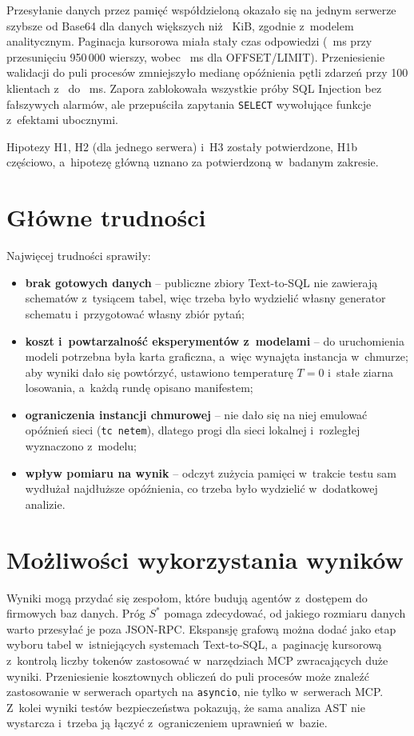 Przesyłanie danych przez pamięć współdzieloną okazało się na jednym serwerze szybsze od Base64 dla danych większych niż \wynSstarLoopShm~KiB, zgodnie z~modelem analitycznym. Paginacja kursorowa miała stały czas odpowiedzi (\wynKeysetDeep~ms przy przesunięciu 950\,000 wierszy, wobec \wynOffsetDeep~ms dla OFFSET/LIMIT). Przeniesienie walidacji do puli procesów zmniejszyło medianę opóźnienia pętli zdarzeń przy 100 klientach z~\wynCcSyncHundredLagMed{} do \wynCcPoolHundredLagMed~ms. Zapora zablokowała wszystkie \wynSecInjection{} próby SQL Injection bez fałszywych alarmów, ale przepuściła zapytania \texttt{SELECT} wywołujące funkcje z~efektami ubocznymi.

Hipotezy H1, H2 (dla jednego serwera) i~H3 zostały potwierdzone, H1b częściowo, a~hipotezę główną uznano za potwierdzoną w~badanym zakresie.


\section{Główne trudności}
\label{sec:wstep_trudnosci}

Najwięcej trudności sprawiły:
\begin{itemize}
    \item \textbf{brak gotowych danych} -- publiczne zbiory Text-to-SQL nie zawierają schematów z~tysiącem tabel, więc trzeba było wydzielić własny generator schematu i~przygotować własny zbiór pytań;
    \item \textbf{koszt i~powtarzalność eksperymentów z~modelami} -- do uruchomienia modeli potrzebna była karta graficzna, a~więc wynajęta instancja w~chmurze; aby wyniki dało się powtórzyć, ustawiono temperaturę $T = 0$ i~stałe ziarna losowania, a~każdą rundę opisano manifestem;
    \item \textbf{ograniczenia instancji chmurowej} -- nie dało się na niej emulować opóźnień sieci (\texttt{tc netem}), dlatego progi dla sieci lokalnej i~rozległej wyznaczono z~modelu;
    \item \textbf{wpływ pomiaru na wynik} -- odczyt zużycia pamięci w~trakcie testu sam wydłużał najdłuższe opóźnienia, co trzeba było wydzielić w~dodatkowej analizie.
\end{itemize}


\section{Możliwości wykorzystania wyników}
\label{sec:wstep_wykorzystanie}

Wyniki mogą przydać się zespołom, które budują agentów z~dostępem do firmowych baz danych. Próg $S^*$ pomaga zdecydować, od jakiego rozmiaru danych warto przesyłać je poza JSON-RPC. Ekspansję grafową można dodać jako etap wyboru tabel w~istniejących systemach Text-to-SQL, a~paginację kursorową z~kontrolą liczby tokenów zastosować w~narzędziach MCP zwracających duże wyniki. Przeniesienie kosztownych obliczeń do puli procesów może znaleźć zastosowanie w serwerach opartych na \texttt{asyncio}, nie tylko w~serwerach MCP. Z~kolei wyniki testów bezpieczeństwa pokazują, że sama analiza AST nie wystarcza i~trzeba ją łączyć z~ograniczeniem uprawnień w~bazie.

